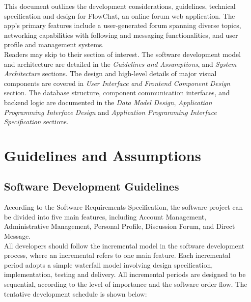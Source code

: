 \documentclass[11pt, a4paper]{article}
\begin{document}
This document outlines the development considerations, guidelines, technical specification and design for FlowChat, an online forum web application. The app’s primary features include a user-generated forum spanning diverse topics, networking capabilities with following and messaging functionalities, and user profile and management systems.\\

Readers may skip to their section of interest. The software development model and architecture are detailed in the \textit{Guidelines and Assumptions}, and \textit{System Architecture} sections. The design and high-level details of major visual components are covered in \textit{User Interface and Frontend Component Design} section. The database structure, component communication interfaces, and backend logic are documented in the \textit{Data Model Design}, \textit{Application Programming Interface Design} and \textit{Application Programming Interface Specification} sections.

\section{Guidelines and Assumptions}

\subsection{Software Development Guidelines}
According to the Software Requirements Specification, the software project can be divided into five main features, including Account Management, Administrative Management, Personal Profile, Discussion Forum, and Direct Message. \\

All developers should follow the incremental model in the software development process, where an incremental refers to one main feature. Each incremental period adopts a simple waterfall model involving design specification, implementation, testing and delivery. All incremental periods are designed to be sequential, according to the level of importance and the software order flow. The tentative development schedule is shown below: \\
\end{document}
